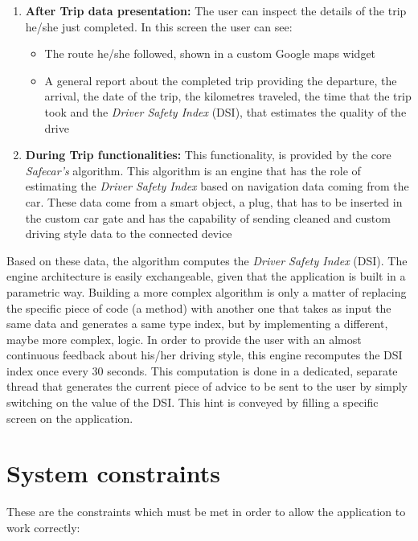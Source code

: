 \begin{enumerate}
	\item \textbf{After Trip data presentation:} The user can inspect the details of the trip he/she just completed. In this screen the user can see:
	\begin{itemize}
		\item The route he/she followed, shown in a custom Google maps widget
		\item A general report about the completed trip providing the departure, the arrival, the date of the trip, the kilometres traveled, the time that the trip took and the \textit{Driver Safety Index} (DSI), that estimates the quality of the drive
	\end{itemize}
	\item \textbf{During Trip functionalities:} This functionality, is provided by the core \textit{Safecar's} algorithm. This algorithm is an engine that has the role of estimating the \textit{Driver Safety Index} based on navigation data coming from the car. These data come from a smart object, a plug, that has to be inserted in the custom car gate and has the capability of sending cleaned and custom driving style data to the connected device
\end{enumerate}
Based on these data, the algorithm computes the \textit{Driver Safety Index} (DSI). The engine architecture is easily exchangeable, given that the application is built in a parametric way. Building a more complex algorithm is only a matter of replacing the specific piece of code (a method) with another one that takes as input the same data and generates a same type index, but by implementing a different, maybe more complex, logic.
In order to provide the user with an almost continuous feedback about his/her driving style, this engine recomputes the DSI index once every 30 seconds.
This computation is done in a dedicated, separate thread that generates the current piece of advice to be sent to the user by simply switching on the value of the DSI. This hint is conveyed by filling a specific screen on the application.

\clearpage
\section{System constraints}
These are the constraints which must be met in order to allow the application to work correctly:

